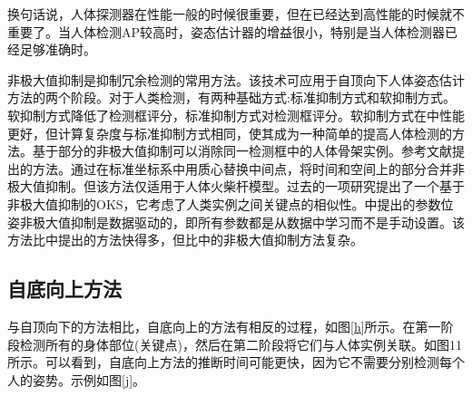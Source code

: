 \documentclass[hyperref]{ctexart}
\begin{document}
\begin{multicols}{2}
		换句话说，人体探测器在性能一般的时候很重要，但在已经达到高性能的时候就不重要了。当人体检测AP较高时，姿态估计器的增益很小，特别是当人体检测器已经足够准确时。
		
		非极大值抑制是抑制冗余检测的常用方法。该技术可应用于自顶向下人体姿态估计方法的两个阶段。对于人类检测，有两种基础方式:标准抑制方式和软抑制方式\cite{bodla1704improving}。软抑制方式降低了检测框评分，标准抑制方式对检测框评分。软抑制方式在\cite{chen2018cascaded}中性能更好，但计算复杂度与标准抑制方式相同，使其成为一种简单的提高人体检测的方法。基于部分的非极大值抑制\cite{burgos2013merging}\cite{chen2015parsing}\cite{chen2014detect}可以消除同一检测框中的人体骨架实例。参考文献提出的方法。\cite{burgos2013merging}通过在标准坐标系中用质心替换中间点，将时间和空间上的部分合并非极大值抑制。但该方法仅适用于人体火柴杆模型。过去的一项研究\cite{chen2018cascaded}提出了一个基于非极大值抑制的OKS，它考虑了人类实例之间关键点的相似性。\cite{fang2017rmpe}中提出的参数位姿非极大值抑制是数据驱动的，即所有参数都是从数据中学习而不是手动设置。该方法比\cite{burgos2013merging}中提出的方法快得多，但比\cite{chen2018cascaded}中的非极大值抑制方法复杂。
		\subsection{自底向上方法}
		与自顶向下的方法相比，自底向上的方法有相反的过程，如图\ref{h}所示。在第一阶段检测所有的身体部位(关键点)，然后在第二阶段将它们与人体实例关联。如图11所示。可以看到，自底向上方法的推断时间可能更快，因为它不需要分别检测每个人的姿势。示例如图\ref{j}。
		

\end{multicols}
\end{document}
